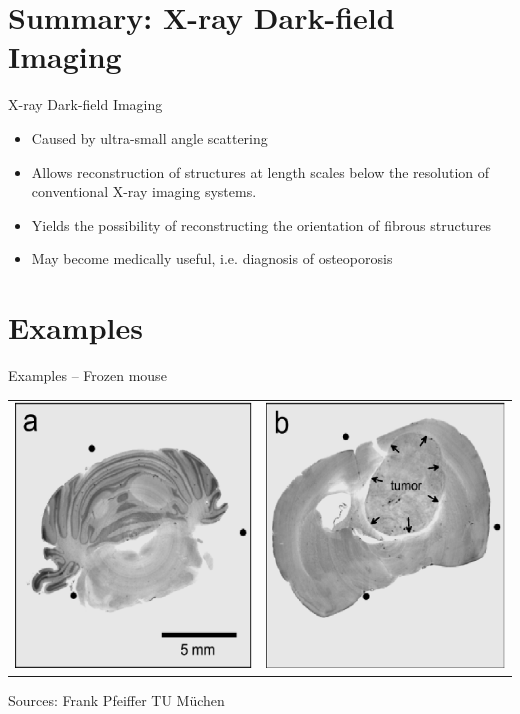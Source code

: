 \section{Summary: X-ray Dark-field Imaging}%
\label{sec:further_reading}

\begin{frame}[c]{X-ray Dark-field Imaging}
    \begin{itemize}
        \large
        \setlength\itemsep{0.3cm}
        \item<1-> Caused by ultra-small angle scattering
        \item<2-> Allows reconstruction of structures at length scales below
              the resolution of conventional X-ray imaging systems.
        \item<3-> Yields the possibility of reconstructing the orientation of fibrous structures
        \item<4-> May become medically useful, i.e. diagnosis of osteoporosis

    \end{itemize}
\end{frame}

\section{Examples}%
\label{sec:examples}

\begin{frame}[c]{Examples -- Frozen mouse}
    \begin{center}
        \begin{tabular}{ll}
            \includegraphics[width=0.3\linewidth]{images/brainrat1.eps} & \includegraphics[width=0.3\linewidth]{images/brainrat2.eps}
        \end{tabular}
    \end{center}

    \begin{center}
        \begin{flushright}
            \scriptsize Sources: Frank Pfeiffer TU M\"uchen
        \end{flushright}
    \end{center}
\end{frame}

